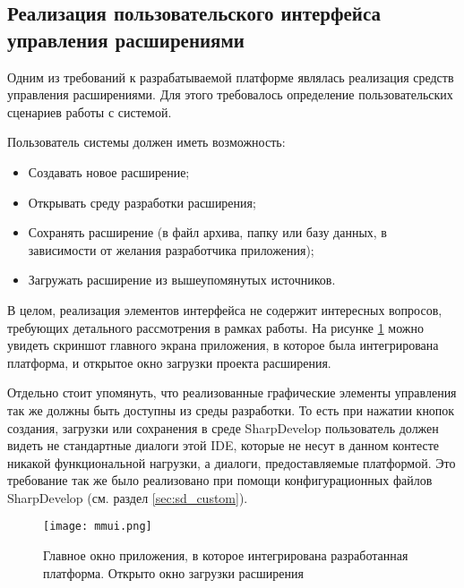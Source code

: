 
\subsection{Реализация пользовательского интерфейса управления расширениями}
\label{sec:macro-gui}

Одним из требований к разрабатываемой платформе являлась реализация средств управления расширениями. Для этого требовалось определение пользовательских сценариев работы с системой.

Пользователь системы должен иметь возможность:

\begin{itemize}
  \item Создавать новое расширение;
  \item Открывать среду разработки расширения;
  \item Сохранять расширение (в файл архива, папку или базу данных, в зависимости от желания разработчика приложения);
  \item Загружать расширение из вышеупомянутых источников.
\end{itemize}

В целом, реализация элементов интерфейса не содержит интересных вопросов, требующих детального рассмотрения в рамках работы. На рисунке \ref{pic:mmui} можно увидеть скриншот главного экрана приложения, в которое была интегрирована платформа, и открытое окно загрузки проекта расширения.

Отдельно стоит упомянуть, что реализованные графические элементы управления так же должны быть доступны из среды разработки. То есть при нажатии кнопок создания, загрузки или сохранения в среде SharpDevelop пользователь должен видеть не стандартные диалоги этой IDE, которые не несут в данном контесте никакой функциональной нагрузки, а диалоги, предоставляемые платформой. Это требование так же было реализовано при помощи конфигурационных файлов SharpDevelop (см. раздел \ref{sec:sd_custom}).

\begin{figure}[!h]
    \centering
    \texttt{[image: mmui.png]}
    \caption{Главное окно приложения, в которое интегрирована разработанная платформа. Открыто окно загрузки расширения}
    \label{pic:mmui}
\end{figure}


